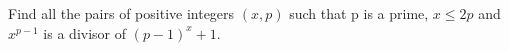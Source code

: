 Find all the pairs of positive integers $(x,p)$ such that p is a prime, $x \leq 2p$ and $x^{p-1}$ is a divisor of $ (p-1)^{x}+1$.